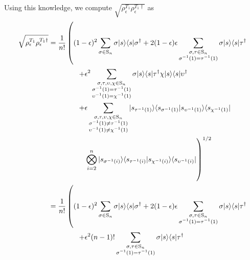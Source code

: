 Using this knowledge, we compute $\sqrt{\rho_{\epsilon}^{T_1}\rho_{\epsilon}^{T_1\dagger}}$ as
\begin{align}
\sqrt{\rho_{\epsilon}^{T_1}\rho_{\epsilon}^{T_1\dagger}} &= \frac{1}{n!} \left(\vphantom{\sum_{\substack{a\\b\\c\\d}}}(1-\epsilon)^2\sum_{\sigma\in \textrm{S}_n}\sigma|s\rangle\langle s|\sigma^\dagger + 2(1-\epsilon)\epsilon\sum_{\substack{\sigma,\tau \in \textrm{S}_n\\\sigma^{-1}(1) = \tau^{-1}(1)}}\sigma|s\rangle\langle s|\tau^\dagger\right.\nonumber\\
&\quad\quad\quad\quad\left.+ \epsilon^2\sum_{\substack{\sigma,\tau,\upsilon,\chi \in \textrm{S}_n\\\sigma^{-1}(1) = \tau^{-1}(1)\\\upsilon^{-1}(1) = \chi^{-1}(1)}}\sigma|s\rangle\langle s|\tau^\dagger\chi|s\rangle\langle s|\upsilon^\dagger\right.\nonumber\\
&\quad\quad\quad\quad\left. + \epsilon\sum_{\substack{\sigma,\tau,\upsilon,\chi \in \textrm{S}_n\\\sigma^{-1}(1) \neq \tau^{-1}(1)\\\upsilon^{-1}(1) \neq \chi^{-1}(1)}}|s_{\tau^{-1}(1)}\rangle\langle s_{\sigma^{-1}(1)}|s_{\upsilon^{-1}(1)}\rangle\langle s_{\chi^{-1}(1)}|\right.\nonumber\\
&\quad\quad\quad\quad\quad\left.\bigotimes_{i=2}^n|s_{\sigma^{-1}(i)}\rangle\langle s_{\tau^{-1}(i)}|s_{\chi^{-1}(i)}\rangle\langle s_{\upsilon^{-1}(i)}|\vphantom{\sum_{\substack{a\\b\\c\\d}}}\right)^{1/2}\\
&= \frac{1}{n!}\left(\vphantom{\sum_{\substack{a\\b\\c\\d}}}(1-\epsilon)^2\sum_{\sigma\in \textrm{S}_n}\sigma|s\rangle\langle s|\sigma^\dagger + 2(1-\epsilon)\epsilon\sum_{\substack{\sigma,\tau \in \textrm{S}_n\\\sigma^{-1}(1) = \tau^{-1}(1)}}\sigma|s\rangle\langle s|\tau^\dagger\right.\nonumber\\
&\quad\quad\quad\quad\left. + \epsilon^2(n-1)!\sum_{\substack{\sigma,\tau \in \textrm{S}_n\\\sigma^{-1}(1) = \tau^{-1}(1)}}\sigma|s\rangle\langle s|\tau^\dagger \right.\nonumber\\

\end{align}

